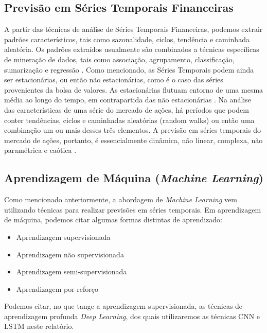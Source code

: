 \subsection{\textbf{Previsão em Séries Temporais Financeiras}}
 \par
A partir das técnicas de análise de Séries Temporais Financeiras, podemos extrair padrões característicos, tais como sazonalidade, ciclos, tendência e caminhada aleatória. Os padrões extraídos usualmente são combinados a técnicas específicas de mineração de dados, tais como associação, agrupamento, classificação, sumarização e regressão \cite{fu2011}. Como mencionado, as Séries Temporais podem ainda ser estacionárias, ou então não estacionárias, como é o caso das séries provenientes da bolsa de valores. As estacionárias flutuam entorno de uma mesma média ao longo do tempo, em contrapartida das não estacionárias \cite{fu2011}. Na análise das características de uma série do mercado de ações, há períodos que podem conter tendências, ciclos e caminhadas aleatórias (random walks) ou então uma combinação um ou mais desses três elementos. A previsão em séries temporais do mercado de ações, portanto, é essencialmente dinâmica, não linear, complexa, não paramétrica e caótica \cite{abuMostafaAtiya96}.

\subsection{\textbf{Aprendizagem de Máquina (\textit{Machine Learning})}}

\par
Como mencionado anteriormente, a abordagem de \textit{Machine Learning} vem utilizando técnicas para realizar previsões em séries temporais. Em aprendizagem de máquina, podemos citar algumas formas distintas de aprendizado:

\begin{itemize}
    \item{Aprendizagem supervisionada}
    \item{Aprendizagem não supervisionada}
    \item{Aprendizagem semi-supervisionada}
    \item{Aprendizagem por reforço}
\end{itemize}

\par
Podemos citar, no que tange a aprendizagem supervisionada, as técnicas de aprendizagem profunda \textit{Deep Learning}, dos quais utilizaremos as técnicas CNN e LSTM neste relatório.

